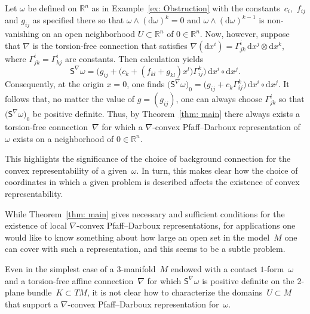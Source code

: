 \documentclass[pdftex]{sigma}
\renewcommand{\d}{\mathrm{d}}%
\newcommand{\Ss}{\mathsf{S}}
\newcommand{\w}{\wedge}
\numberwithin{equation}{section}
\begin{document}
\begin{Example}%
Let $\omega$ be defined on $\mathbb{R}^n$ as in Example~\ref{ex: Obstruction}
with the constants~$c_i$,~$f_{ij}$ and $g_{ij}$ as specified there
so that $\omega\w (\d\omega)^k=0$ and $\omega\w(\d\omega)^{k-1}$
is non-vanishing on an open neighborhood $U\subset\mathbb{R}^n$ of $0\in\mathbb{R}^n$. Now, however, suppose that $\nabla$ is the
torsion-free connection that satisfies $\nabla(\d x^i) = \Gamma^i_{jk}\,\d x^j\otimes \d x^k$, where $\Gamma^i_{jk}=\Gamma^i_{kj}$ are constants.
Then calculation yields
\[
\Ss^\nabla\omega
= \bigl(g_{ij}+\bigl(c_k+(f_{kl}+g_{kl})x^l\bigr)\Gamma^k_{ij}\bigr)
\,\d x^i\circ\d x^j.
\]
Consequently, at the origin $x=0$, one finds $\big(\Ss^\nabla\omega\big)_0
= \bigl(g_{ij}+c_k\Gamma^k_{ij}\bigr)\,\d x^i\circ\d x^j$. It follows
that, no matter the value of $g = (g_{ij})$, one can always choose
$\Gamma^i_{jk}$ so that $\big(\Ss^\nabla\omega\big)_0$
be positive definite.
Thus, by Theorem~\ref{thm: main} there always exists a
torsion-free connection~$\nabla$
for which a $\nabla$-convex Pfaff--Darboux representation of $\omega$
exists on a neighborhood of $0\in\mathbb{R}^n$.

This highlights the significance of the choice of background connection
for the convex representability of a given~$\omega$. In turn,
this makes clear how the choice of coordinates in which a given
problem is described affects the existence of convex representability.
\end{Example}

\begin{Remark}
While Theorem~\ref{thm: main} gives necessary and sufficient conditions
for the existence of local $\nabla$-convex Pfaff--Darboux representations,
for applications one would like to know something about how large an open
set in the model~$M$ one can cover with such a representation,
and this seems to be a subtle problem.

Even in the simplest case of a $3$-manifold~$M$
endowed with a contact $1$-form~$\omega$
and a torsion-free affine connection~$\nabla$
for which $\Ss^\nabla\omega$ is positive definite
on the $2$-plane bundle~$K\subset TM$,
it is not clear how to characterize the domains~$U\subset M$
that support a $\nabla$-convex Pfaff--Darboux representation for~$\omega$.
\end{Remark}
\end{document}
